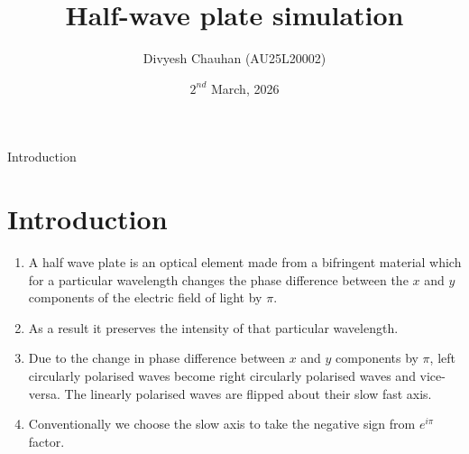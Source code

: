 \documentclass[12pt]{beamer}
\author{Divyesh Chauhan (AU25L20002)}
\title{Half-wave plate simulation}
\date{$2^{nd}$ March, 2026}
\begin{document}
\begin{frame}
\titlepage
\end{frame}

\begin{frame}
\tableofcontents
\end{frame}

\begin{frame}{Introduction}
\section{Introduction}
\begin{enumerate}
	\item A half wave plate is an optical element made from a bifringent material which for a particular wavelength changes the phase difference between the $x$ and $y$ components of the electric field of light by $\pi$.
	\item As a result it preserves the intensity of that particular wavelength.
	\item Due to the change in phase difference between $x$ and $y$ components by $\pi$, left circularly polarised waves become right circularly polarised waves and vice-versa. The linearly polarised waves are flipped about their slow fast axis.
	\item Conventionally we choose the slow axis to take the negative sign from $e^ {i \pi}$ factor.
\end{enumerate}
\end{frame}
\end{document}
